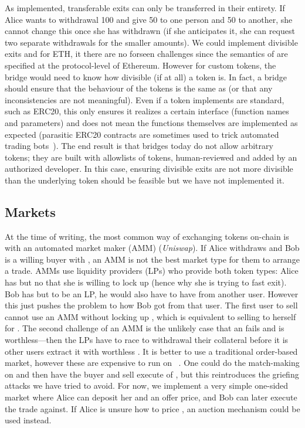 As implemented, transferable exits can only be transferred in their entirety. If Alice wants to withdrawal 100 \ethtwo and give 50 \ethxx to one person and 50 \ethxx to another, she cannot change this once she has withdrawn (if she anticipates it, she can request two separate withdrawals for the smaller amounts). We could implement divisible exits and for ETH, it there are no forseen challenges since the semantics of \ethone are specified at the protocol-level of Ethereum. However for custom tokens, the bridge would need to know how divisible (if at all) a token is. In fact, a bridge should ensure that the \layertwo behaviour of the tokens is the same as \layerone (or that any inconsistencies are not meaningful). Even if a token implements are standard, such as ERC20, this only ensures it realizes a certain interface (function names and parameters) and does not mean the functions themselves are implemented as expected (parasitic ERC20 contracts are sometimes used to trick automated trading bots~\cite{}). The end result is that bridges today do not allow arbitrary tokens; they are built with allowlists of tokens, human-reviewed and added by an authorized developer. In this case, ensuring divisible exits are not more divisible than the underlying token should be feasible but we have not implemented it.

\subsection{Markets}
\label{sec:uniswap}

At the time of writing, the most common way of exchanging tokens on-chain is with an automated market maker (AMM) (\eg \textit{Uniswap}). If Alice withdraws \ethxx and Bob is a willing buyer with \ethone, an AMM is not the best market type for them to arrange a trade. AMMs use liquidity providers (LPs) who provide both token types: Alice has \ethxx but no \ethone that she is willing to lock up (hence why she is trying to fast exit). Bob has \ethone but to be an LP, he would also have to have \ethxx from another user. However this just pushes the problem to how Bob got \ethxx from that user. The first user to sell \ethxx cannot use an AMM without locking up \ethone, which is equivalent to selling \ethxx to herself for \ethone. The second challenge of an AMM is the unlikely case that an \rblock fails and \ethxx is worthless---then the LPs have to race to withdrawal their collateral before it is other users extract it with worthless \ethxx. It is better to use a traditional order-based market, however these are expensive to run on \layerone~\cite{moosavi2021lissy}. One could do the match-making on \layertwo and then have the buyer and sell execute of \layerone, but this reintroduces the griefing attacks we have tried to avoid. For now, we implement a very simple one-sided market where Alice can deposit her \ethxx and an offer price, and Bob can later execute the trade against. If Alice is unsure how to price \ethxx, an auction mechanism could be used instead. 


